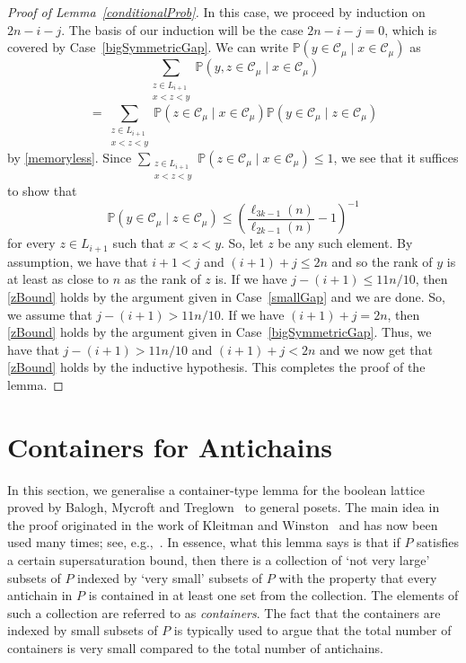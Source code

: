 \documentclass[11 pt]{article}
\theoremstyle{definition}
\theoremstyle{case}
\numberwithin{equation}{section}
\begin{document}
\begin{proof}[Proof of Lemma~\ref{conditionalProb}]
In this case, we proceed by induction on $2n-i-j$. The basis of our induction will be the case $2n-i-j=0$, which is covered by Case~\ref{bigSymmetricGap}. We can write $\mathbb{P}\left(y\in \mathcal{C}_\mu\mid x\in\mathcal{C}_\mu\right)$ as
\[\sum_{\substack{z\in L_{i+1} \\ x<z<y}}\mathbb{P}\left(y,z\in \mathcal{C}_\mu\mid x\in\mathcal{C}_\mu\right)\]
\[=\sum_{\substack{z\in L_{i+1} \\ x<z<y}}\mathbb{P}\left(z\in \mathcal{C}_\mu\mid x\in\mathcal{C}_\mu\right)\mathbb{P}\left(y\in \mathcal{C}_\mu\mid z\in\mathcal{C}_\mu\right)\]
by \eqref{memoryless}. Since  $\sum_{\substack{z\in L_{i+1} \\ x<z<y}}\mathbb{P}\left(z\in \mathcal{C}_\mu\mid x\in\mathcal{C}_\mu\right)\leq 1$, we see that it suffices to show that 
\begin{equation}\label{zBound}\mathbb{P}\left(y\in \mathcal{C}_\mu\mid z\in\mathcal{C}_\mu\right)\leq\left(\frac{\ell_{3k-1}(n)}{\ell_{2k-1}(n)} - 1\right)^{-1}\end{equation}
for every $z\in L_{i+1}$ such that $x<z<y$. So, let $z$ be any such element. By assumption, we have that $i+1<j$ and $(i+1)+j\leq 2n$ and so the rank of $y$ is at least as close to $n$ as the rank of $z$ is. If we have $j-(i+1) \leq 11n/10$, then \eqref{zBound} holds by the argument given in Case~\ref{smallGap} and we are done. So, we assume that $j-(i+1) > 11n/10$. If we have $(i+1)+j=2n$, then \eqref{zBound} holds by the argument given in Case~\ref{bigSymmetricGap}. Thus, we have that $j-(i+1)>11n/10$ and $(i+1)+j<2n$ and we now get that \eqref{zBound} holds by the inductive hypothesis. This completes the proof of the lemma.
\end{proof}

\section{Containers for Antichains}
\label{containerSec}

In this section, we generalise a container-type lemma for the boolean lattice proved by Balogh, Mycroft and Treglown~\cite{RandomSperner} to general posets. The main idea in the proof originated in the work of Kleitman and Winston~\cite{KleitmanWinston} and has now been used many times; see, e.g.,~\cite{RandomSperner,BaloghWagnerBoolean,GraphCont}. In essence, what this lemma says is that if $P$ satisfies a certain supersaturation bound, then there is a collection of `not very large' subsets of $P$ indexed by `very small' subsets of $P$ with the property that every antichain in $P$ is contained in at least one set from the collection. The elements of such a collection are referred to as \emph{containers}. The fact that the containers are indexed by small subsets of $P$ is typically used to argue that the total number of containers is very small compared to the total number of antichains.
\end{document}
